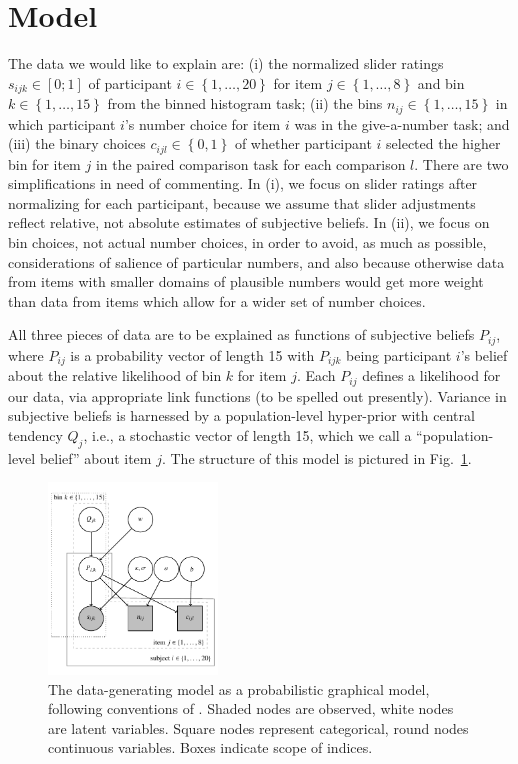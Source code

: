 \documentclass[10pt,letterpaper]{article}
\newcommand{\set}[1]{\left\{#1\right\}}
\newcommand{\citet}[1]{\citeA{#1}}
\newcommand{\figref}[1]{Fig.~\ref{#1}}
\begin{document}
\section{Model}

The data we would like to explain are: (i) the normalized slider ratings $s_{ijk} \in [0;1]$ of
participant $i \in \set{1, \dots, 20}$ for item $j \in \set{1, \dots, 8}$ and bin
$k \in \set{1, \dots, 15}$ from the binned histogram task; (ii) the bins $n_{ij} \in \set{1, \dots, 15}$ in which participant
$i$'s number choice for item $i$ was in the give-a-number task; and (iii) the binary choices $c_{ijl} \in \set{0,1}$ of
whether participant $i$ selected the higher bin for item $j$ in the paired comparison task for each comparison
$l$. There are two simplifications in need of commenting. In (i), we focus on slider ratings after
normalizing for each participant, because we assume that slider adjustments reflect relative, not
absolute estimates of subjective beliefs. In (ii), we focus on bin choices, not actual number
choices, in order to avoid, as much as possible, considerations of salience of particular
numbers, and also because otherwise data from items with smaller domains of plausible numbers
would get more weight than data from items which allow for a wider set of number choices.

All three pieces of data are to be explained as functions of subjective beliefs $P_{ij}$, where
$P_{ij}$ is a probability vector of length 15 with $P_{ijk}$ being participant $i$'s belief about
the relative likelihood of bin $k$ for item $j$. Each $P_{ij}$ defines a likelihood for our
data, via appropriate link functions (to be spelled out presently). Variance in subjective
beliefs is harnessed by a population-level hyper-prior with central tendency $Q_{j}$, i.e., a
stochastic vector of length 15, which we call a ``population-level belief'' about item $j$. The
structure of this model is pictured in \figref{fig:ModelGraph}.

\begin{figure}[]
  \centering
  \includegraphics[width = 0.4\textwidth]{modelGraph/modelGraphNoMath.pdf}
  \caption{The data-generating model as a probabilistic graphical model, following conventions
    of \citet{LeeWagenmakers2013:Bayesian-Cognit}. Shaded nodes are observed, white nodes are
    latent variables. Square nodes represent categorical, round nodes continuous
    variables. Boxes indicate scope of indices.}
  \label{fig:ModelGraph}
\end{figure}
\end{document}
